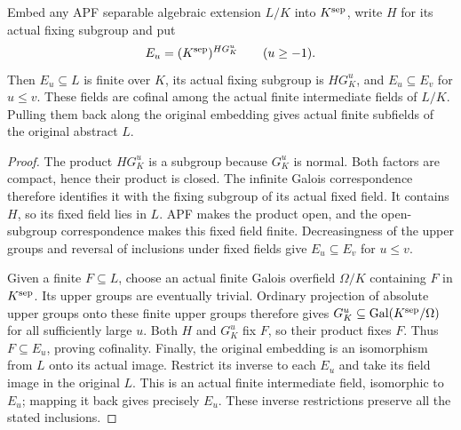 \begin{lemma}
\label{fw:apf-finite-stages}
\leanok
Embed any APF separable algebraic extension $L/K$ into $K^{\rm sep}$,
write $H$ for its actual fixing subgroup and put
\[
 E_u=(K^{\rm sep})^{H G_K^u}\qquad(u\geq-1).
\]
Then $E_u\subseteq L$ is finite over $K$, its actual fixing
subgroup is $H G_K^u$, and $E_u\subseteq E_v$ for $u\leq v$.
These fields are cofinal among the actual finite intermediate
fields of $L/K$. Pulling them back along the original embedding
gives actual finite subfields of the original abstract $L$.
\end{lemma}
\begin{proof}
The product $H G_K^u$ is a subgroup because $G_K^u$ is normal.
Both factors are compact, hence their product is closed. The
infinite Galois correspondence therefore identifies it with
the fixing subgroup of its actual fixed field. It contains $H$,
so its fixed field lies in $L$. APF makes the product open, and
the open-subgroup correspondence makes this fixed field finite.
Decreasingness of the upper groups and reversal of inclusions
under fixed fields give $E_u\subseteq E_v$ for $u\leq v$.

Given a finite $F\subseteq L$, choose an actual finite Galois
overfield $\Omega/K$ containing $F$ in $K^{\rm sep}$. Its upper
groups are eventually trivial. Ordinary projection of absolute
upper groups onto these finite upper groups therefore gives
$G_K^u\subseteq\operatorname{Gal}(K^{\rm sep}/\Omega)$ for all
sufficiently large $u$. Both $H$ and $G_K^u$ fix $F$, so their
product fixes $F$. Thus $F\subseteq E_u$, proving cofinality.
Finally, the original embedding is an isomorphism from $L$
onto its actual image. Restrict its inverse to each $E_u$ and
take its field image in the original $L$. This is an actual
finite intermediate field, isomorphic to $E_u$; mapping it
back gives precisely $E_u$. These inverse restrictions preserve
all the stated inclusions.
\end{proof}

